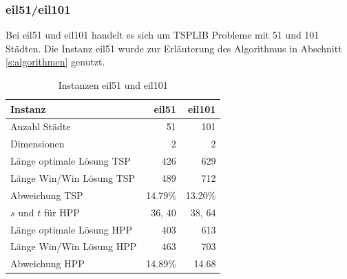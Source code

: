 \documentclass[11pt,a4paper]{article}
\begin{document}
\subsubsection{eil51/eil101}
Bei eil51 und eil101 handelt es sich um TSPLIB Probleme mit 51 und 101 Städten. Die Instanz eil51 wurde zur Erläuterung des Algorithmus in Abschnitt \ref{s:algorithmen} genutzt.

\begin{table}[H]
        \centering
        \begin{tabular}{| l | r | r |}
            \hline
                Instanz                     & \textbf{eil51}
                                            & \textbf{eil101} \\ \hline
                Anzahl Städte               & 51        & 101       \\ \hline
                Dimensionen                 & 2         & 2         \\ \hline
                Länge optimale Lösung TSP   & 426       & 629       \\ \hline
                Länge Win/Win Lösung  TSP   & 489       & 712       \\ \hline
                Abweichung TSP              & 14.79\%   & 13.20\%   \\ \hline
                $s$ und $t$ für HPP         & 36, 40    & 38, 64    \\ \hline
                Länge optimale Lösung HPP   & 403       & 613       \\ \hline
                Länge Win/Win Lösung  HPP   & 463       & 703       \\ \hline
                Abweichung HPP              & 14.89\%   & 14.68     \\ \hline
        \end{tabular}
        \caption{Instanzen eil51 und eil101}
        \label{tab:instanzen_eil}
\end{table}
\end{document}
